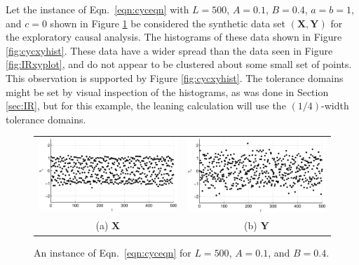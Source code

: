 Let the instance of Eqn.\ \ref{eqn:cyceqn} with $L=500$, $A=0.1$, $B=0.4$, $a=b=1$, and $c=0$ shown in Figure \ref{fig:cycxyplot} be considered the synthetic data set $(\mathbf{X},\mathbf{Y})$ for the exploratory causal analysis.  The histograms of these data shown in Figure \ref{fig:cycxyhist}.  These data have a wider spread than the data seen in Figure \ref{fig:IRxyplot}, and do not appear to be clustered about some small set of points.  This observation is supported by Figure \ref{fig:cycxyhist}.  The tolerance domains might be set by visual inspection of the histograms, as was done in Section \ref{sec:IR}, but for this example, the leaning calculation will use the $(1/4)$-width tolerance domains.
\begin{figure}[ht]
\begin{tabular}{cc}
\includegraphics[scale=0.5]{NoisyCyclicResponseExample_X.eps} & \includegraphics[scale=0.5]{NoisyCyclicResponseExample_Y.eps} \\
(a) $\mathbf{X}$ & (b) $\mathbf{Y}$
\end{tabular}
\caption{An instance of Eqn.\ \ref{eqn:cyceqn} for $L=500$, $A=0.1$, and $B=0.4$.}
\label{fig:cycxyplot}
\end{figure}


